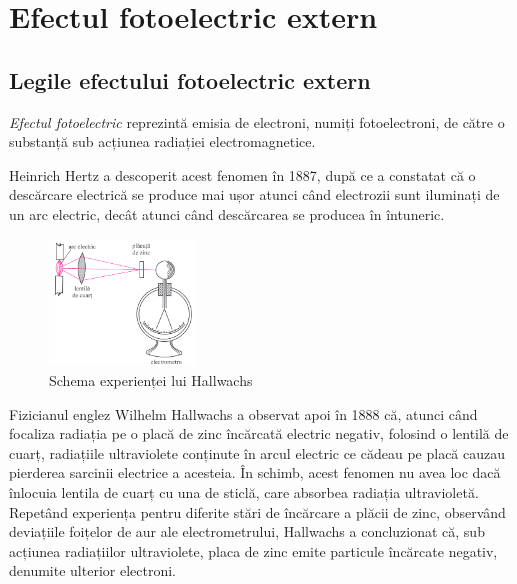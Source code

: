 \section{Efectul fotoelectric extern}

\subsection{Legile efectului fotoelectric extern}

\emph{Efectul fotoelectric} reprezintă emisia de electroni, numiți
fotoelectroni, de către o substanță sub acțiunea radiației electromagnetice.

Heinrich Hertz a descoperit acest fenomen în 1887, după ce a constatat că
o descărcare electrică se produce mai ușor atunci când electrozii sunt iluminați
de un arc electric, decât atunci când descărcarea se producea în întuneric.

\clearpage

\begin{figure}
    \includegraphics[width=0.35\textwidth]{fig/hallwachs}
    \caption{Schema experienței lui Hallwachs}
\end{figure}

Fizicianul englez Wilhelm Hallwachs a observat apoi în 1888 că, atunci când
focaliza radiația pe o placă de zinc încărcată electric negativ, folosind o
lentilă de cuarț, radiațiile ultraviolete conținute în arcul electric ce cădeau
pe placă cauzau pierderea sarcinii electrice a acesteia. În schimb, acest
fenomen nu avea loc dacă înlocuia lentila de cuarț cu una de sticlă, care
absorbea radiația ultravioletă. Repetând experiența pentru diferite stări
de încărcare a plăcii de zinc, observând deviațiile foițelor de aur ale
electrometrului, Hallwachs a concluzionat că, sub acțiunea radiațiilor
ultraviolete, placa de zinc emite particule încărcate negativ, denumite
ulterior electroni.

